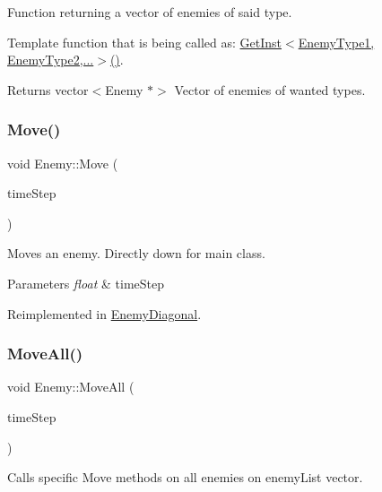 Function returning a vector of enemies of said type. 

Template function that is being called as\+: \hyperlink{class_enemy_a747d610b1a24386b9bd85c50132ffa98}{Get\+Inst$<$\+Enemy\+Type1, Enemy\+Type2,...$>$()}.

\begin{DoxyReturn}{Returns}
vector$<$\+Enemy $\ast$$>$ Vector of enemies of wanted types. 
\end{DoxyReturn}
\mbox{\label{class_enemy_ab7e37cac9017834db50d2aaf94e75034}} 
\subsubsection{\texorpdfstring{Move()}{Move()}}
{\footnotesize\ttfamily void Enemy\+::\+Move (\begin{DoxyParamCaption}\item[{float}]{time\+Step }\end{DoxyParamCaption})\hspace{0.3cm}{\ttfamily [virtual]}}



Moves an enemy. Directly down for main class. 


\begin{DoxyParams}{Parameters}
{\em float} & time\+Step \\
\hline
\end{DoxyParams}


Reimplemented in \hyperlink{class_enemy_diagonal_aa33718254422fa69663e22c00e80d1d9}{Enemy\+Diagonal}.

\mbox{\label{class_enemy_afcf5991522f6f881e97b5910ac353633}} 
\subsubsection{\texorpdfstring{Move\+All()}{MoveAll()}}
{\footnotesize\ttfamily void Enemy\+::\+Move\+All (\begin{DoxyParamCaption}\item[{float}]{time\+Step }\end{DoxyParamCaption})\hspace{0.3cm}{\ttfamily [static]}}



Calls specific Move methods on all enemies on enemy\+List vector. 


